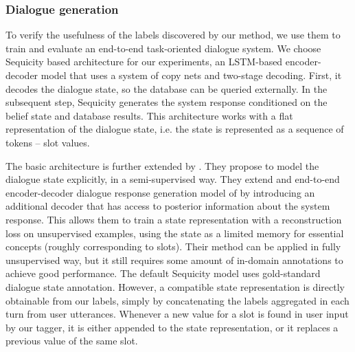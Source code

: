 
\subsubsection{Dialogue generation}
To verify the usefulness of the labels discovered by our method, we use them to train and evaluate an end-to-end task-oriented dialogue system.
We choose Sequicity \cite{lei2018sequicity} based architecture for our experiments, an LSTM-based encoder-decoder model that uses a system of copy nets and two-stage decoding.
First, it decodes the dialogue state, so the database can be queried externally.
In the subsequent step, Sequicity generates the system response conditioned on the belief state and database results.
This architecture works with a flat representation of the dialogue state, i.e. the state is represented as a sequence of tokens -- slot values.

The basic architecture is further extended by \citet{jin2018explicit}.
They propose to model the dialogue state explicitly, in a semi-supervised way.
They extend and end-to-end encoder-decoder dialogue response generation model of \citet{lei2018sequicity} by introducing an additional decoder that has access to posterior information about the system response.
This allows them to train a state representation with a reconstruction loss on unsupervised examples, using the state as a limited memory for essential concepts (roughly corresponding to slots).
Their method can be applied in fully unsupervised way, but it still requires some amount of in-domain annotations to achieve good performance.
The default Sequicity model uses gold-standard dialogue state annotation. However, a compatible state representation is directly obtainable from our labels, simply by concatenating the labels aggregated in each turn from user utterances. Whenever a new value for a slot is found in user input by our tagger, it is either appended to the state representation, or it replaces a previous value of the same slot.

